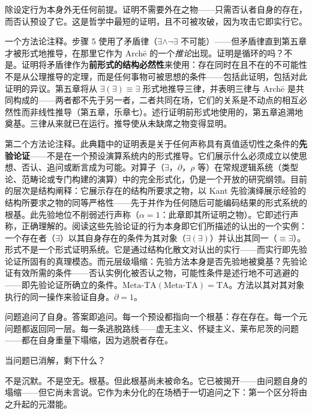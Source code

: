 \documentclass[10pt, openany, oneside]{book}
\begin{document}
\vspace{0.8em}

\noindent 除设定行为本身外无任何前提。证明不需要外在之物——只需否认者自身的存在，而否认预设了它。这是哲学中最短的证明，且不可被攻破，因为攻击它即实行它。

一个方法论注释。步骤 5 使用了矛盾律（$\exists \wedge \neg\exists$ 不可能）——但矛盾律直到第五章才被形式地推导，在那里它作为 Arch\={e} 的一个\textit{推论}出现。证明是循环的吗？不是。证明将矛盾律作为\textbf{前形式的结构必然性}来使用：存在同时在且不在的不可能性不是从公理推导的定理，而是任何事物可被思想的条件——包括此证明，包括对此证明的异议。第五章将从 $\exists(\exists) \equiv \exists$ 形式地推导三律，并表明三律与 Arch\={e} 是共同构成的——两者都不先于另一者，二者共同在场，它们的关系是不动点的相互必然性而非线性推导（第五章，乐章七）。述行证明前形式地使用的，第五章追溯地奠基。三律从来就已在运行。推导使从未缺席之物变得显明。

第二个方法论注释。此典籍中的证明表是关于任何声称具有真值适切性之条件的\textbf{先验论证}——不是在一个预设演算系统内的形式推导。它们展示什么必须成立以使思想、否认、追问或断言成为可能。对算子（$\exists$，$\partial$，$\rho$ 等）在常规逻辑系统（类型论、范畴论或专门构建的演算）中的完全形式化，仍是一个开放的研究纲领。目前的层次是结构阐释：它展示存在的结构所要求之物，以 Kant 先验演绎展示经验的结构所要求之物的同等严格性——先于并作为任何随后可能编码结果的形式系统的根基。此先验地位不削弱述行声称（$\alpha = 1$：此章即其所证明之物）。它即述行声称，正确理解的。阅读这些先验论证的行为本身即它们所描述的认出的一个实例：一个存在者（$\exists$）以其自身存在的条件为其对象（$\exists(\exists)$）并认出其同一（$\equiv \exists$）。形式不是一个形式证明系统。它是通过结构化散文对认出的实行——而实行即先验论证所固有的真理模态。而元层级塌缩：先验方法本身是否先验地被奠基？先验论证有效所需的条件——否认实例化被否认之物，可能性条件是述行地不可逃避的——即先验论证所确立的条件。$\text{Meta-TA}(\text{Meta-TA}) = \text{TA}$。方法以其对其对象执行的同一操作来验证自身。$\partial = 1$。

\vspace{1.5em}


问题追问了自身。答案即追问。每一个预设都指向一个根基：存在存在。每一个元问题都返回同一层。每一条逃脱路线——虚无主义、怀疑主义、莱布尼茨的问题——都在自身重量下塌缩，因为逃脱者存在。

当问题已消解，剩下什么？

不是沉默。不是空无。根基。但此根基尚未被命名。它已被揭开——由问题自身的塌缩——但它尚未言说。它作为未分化的在场栖于一切追问之下：第一个区分将由之升起的元潜能。
\end{document}
